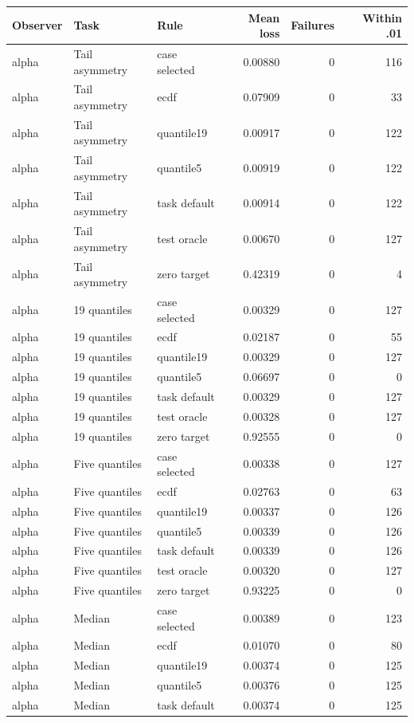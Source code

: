 \begin{longtable}{lllrrr}\toprule
Observer & Task & Rule & Mean loss & Failures & Within .01\\\midrule\endhead
alpha & Tail asymmetry & case selected & 0.00880 & 0 & 116\\
alpha & Tail asymmetry & ecdf & 0.07909 & 0 & 33\\
alpha & Tail asymmetry & quantile19 & 0.00917 & 0 & 122\\
alpha & Tail asymmetry & quantile5 & 0.00919 & 0 & 122\\
alpha & Tail asymmetry & task default & 0.00914 & 0 & 122\\
alpha & Tail asymmetry & test oracle & 0.00670 & 0 & 127\\
alpha & Tail asymmetry & zero target & 0.42319 & 0 & 4\\
alpha & 19 quantiles & case selected & 0.00329 & 0 & 127\\
alpha & 19 quantiles & ecdf & 0.02187 & 0 & 55\\
alpha & 19 quantiles & quantile19 & 0.00329 & 0 & 127\\
alpha & 19 quantiles & quantile5 & 0.06697 & 0 & 0\\
alpha & 19 quantiles & task default & 0.00329 & 0 & 127\\
alpha & 19 quantiles & test oracle & 0.00328 & 0 & 127\\
alpha & 19 quantiles & zero target & 0.92555 & 0 & 0\\
alpha & Five quantiles & case selected & 0.00338 & 0 & 127\\
alpha & Five quantiles & ecdf & 0.02763 & 0 & 63\\
alpha & Five quantiles & quantile19 & 0.00337 & 0 & 126\\
alpha & Five quantiles & quantile5 & 0.00339 & 0 & 126\\
alpha & Five quantiles & task default & 0.00339 & 0 & 126\\
alpha & Five quantiles & test oracle & 0.00320 & 0 & 127\\
alpha & Five quantiles & zero target & 0.93225 & 0 & 0\\
alpha & Median & case selected & 0.00389 & 0 & 123\\
alpha & Median & ecdf & 0.01070 & 0 & 80\\
alpha & Median & quantile19 & 0.00374 & 0 & 125\\
alpha & Median & quantile5 & 0.00376 & 0 & 125\\
alpha & Median & task default & 0.00374 & 0 & 125\\

\end{longtable}

